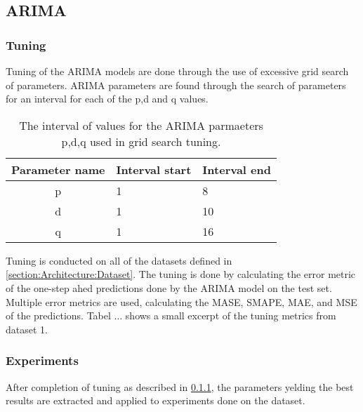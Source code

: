 \subsection{ARIMA}
\label{section:Restuls:ARIMA}


\subsubsection{Tuning}
\label{section:Results:ARIMA:Tuning}
Tuning of the ARIMA models are done through the use of excessive grid search of parameters.
ARIMA parameters are found through the search of parameters for an interval for each of the p,d and q values.

\begin{table}[h]
  \centering
  \caption{The interval of values for the ARIMA parmaeters p,d,q used in grid search tuning.}
  \label{table:results:arima:tuning_parameter_interval}
  \begin{tabular}{|c|l|l|}\hline
    Parameter name & Interval start     & Interval end   \\ \hline
    p   & 1         & 8                 \\ \hline
    d   & 1         & 10                \\ \hline
    q   & 1         & 16                \\ \hline
  \end{tabular}
\end{table}

Tuning is conducted on all of the datasets defined in \cref{section:Architecture:Dataset}.
The tuning is done by calculating the error metric of the one-step ahed predictions done by the ARIMA model on the test set.
Multiple error metrics are used, calculating the MASE, SMAPE, MAE, and MSE of the predictions.
Tabel ... shows a small excerpt of the tuning metrics from dataset 1.


\subsubsection{Experiments}

After completion of tuning as described in \cref{section:Results:ARIMA:Tuning},
the parameters yelding the best results are extracted and applied to experiments done on the dataset.

